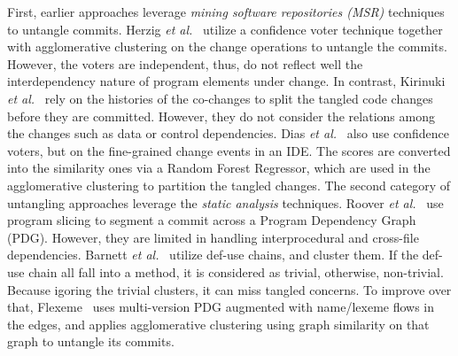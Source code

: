 First, earlier approaches leverage {\em mining software repositories
  (MSR)} techniques to untangle commits. Herzig {\em et
  al.}~\cite{kim-msr13,kim-emse16} utilize a confidence voter
technique together with agglomerative clustering on the change
operations to untangle the commits.
However, the voters are independent, thus, do not reflect well the
interdependency nature of program elements under change. In contrast,
Kirinuki {\em et al.}~\cite{higo-apsec16, higo-icpc14} rely on the
histories of the co-changes to split the tangled code changes before
they are committed. However, they do not consider the relations among
the changes such as data or control dependencies. Dias {\em et
  al.}~\cite{dias-saner15} also use confidence voters, but on the
fine-grained change events in an IDE. The scores are converted into
the similarity ones via a Random Forest Regressor, which are used in
the agglomerative clustering to partition the tangled changes.  The
second category of untangling approaches leverage the {\em static
  analysis} techniques. Roover {\em et al.}~\cite{roover-scam18} use
program slicing to segment a commit across a Program Dependency Graph
(PDG).  However, they are limited in handling interprocedural and
cross-file dependencies. Barnett {\em et al.}~\cite{barnett-icse15}
utilize def-use chains, and cluster them. If the def-use chain all
fall into a method, it is considered as trivial, otherwise,
non-trivial. Because igoring the trivial clusters, it can miss tangled
concerns. To improve over that, Flexeme~\cite{flexeme-fse20} uses
multi-version PDG augmented with name/lexeme flows in the edges, and
applies agglomerative clustering using graph similarity on that graph
to untangle its commits.



